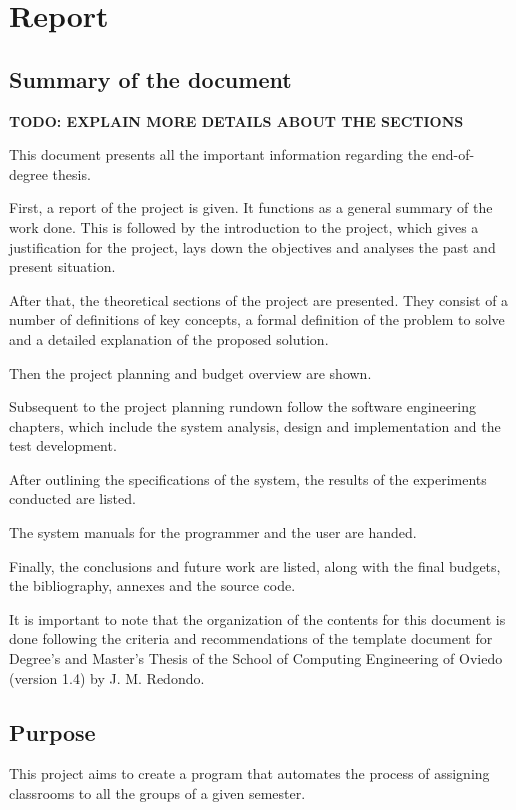 \renewcommand{\documentname}{Report}

\chapter{Report}

\section{Summary of the document}

\textbf{TODO: EXPLAIN MORE DETAILS ABOUT THE SECTIONS}

This document presents all the important information regarding the \textit{\tfg} end-of-degree thesis.

First, a report of the project is given. It functions as a general summary of the work done. This is followed by the introduction to the project, which gives a justification for the project, lays down the objectives and analyses the past and present situation.

After that, the theoretical sections of the project are presented. They consist of a number of definitions of key concepts, a formal definition of the problem to solve and a detailed explanation of the proposed solution.

Then the project planning and budget overview are shown.

Subsequent to the project planning rundown follow the software engineering chapters, which include the system analysis, design and implementation and the test development. 

After outlining the specifications of the system, the results of the experiments conducted are listed.

The system manuals for the programmer and the user are handed.

Finally, the conclusions and future work are listed, along with the final budgets, the bibliography, annexes and the source code.

It is important to note that the organization of the contents for this document is done following the criteria and recommendations of the template document for Degree's and Master's Thesis of the School of Computing Engineering of Oviedo (version 1.4) by J. M. Redondo.

\section{Purpose}

This project aims to create a program that automates the process of assigning classrooms to all the groups of a given semester.

